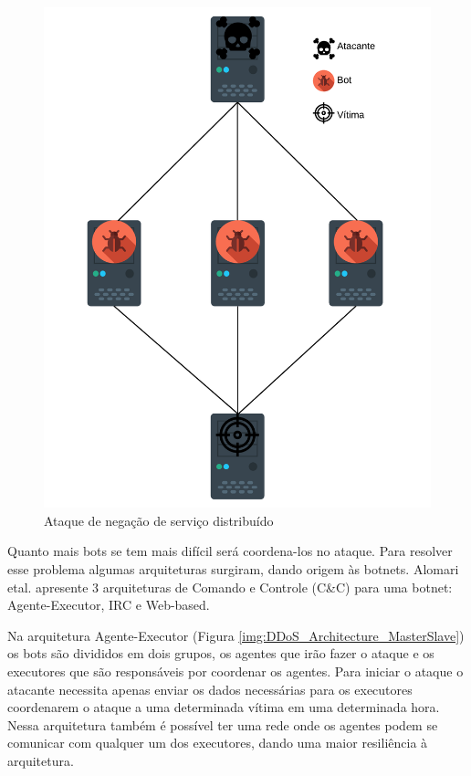 \begin{figure}[H]
     \centering
     \includegraphics[scale=0.6]{img/DDoS.pdf}
     \caption{Ataque de negação de serviço distribuído}
     \label{img:DDoS}
\end{figure}

Quanto mais bots se tem mais difícil será coordena-los no ataque. Para resolver esse problema algumas arquiteturas surgiram, dando origem às botnets. Alomari etal.\cite{Alomari2012} apresente 3 arquiteturas de Comando e Controle (C\&C) para uma botnet: Agente-Executor, \acrfull{IRC} e Web-based.

Na arquitetura Agente-Executor (Figura \ref{img:DDoS_Architecture_MasterSlave}) os bots são divididos em dois grupos, os agentes que irão fazer o ataque e os executores que são responsáveis por coordenar os agentes. Para iniciar o ataque o atacante necessita apenas enviar os dados necessárias para os executores coordenarem o ataque a uma determinada vítima em uma determinada hora.  
Nessa arquitetura também é possível ter uma rede onde os agentes podem se comunicar com qualquer um dos executores, dando uma maior resiliência à arquitetura.

